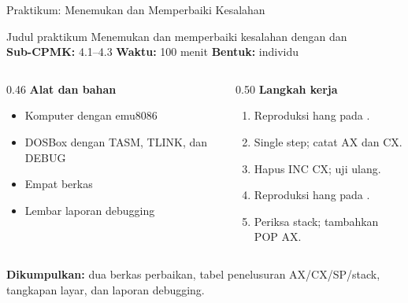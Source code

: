 \documentclass[aspectratio=169,11pt]{beamer}
\begin{document}
\begin{frame}{Praktikum: Menemukan dan Memperbaiki Kesalahan}
\begin{block}{Judul praktikum}
\small Menemukan dan memperbaiki kesalahan dengan 
dan \\[0.15em]
\textbf{Sub-CPMK:} 4.1--4.3 \quad\textbullet\quad
\textbf{Waktu:} 100 menit \quad\textbullet\quad
\textbf{Bentuk:} individu
\end{block}

\vspace{0.2em}
\begin{columns}[t]
\begin{column}{0.46\textwidth}
{\color{obeBlue}\bfseries Alat dan bahan}
\begin{itemize}\footnotesize
    \item Komputer dengan emu8086
    \item DOSBox dengan TASM, TLINK, dan DEBUG
    \item Empat berkas 
    \item Lembar laporan debugging
\end{itemize}
\end{column}
\begin{column}{0.50\textwidth}
{\color{obeBlue}\bfseries Langkah kerja}
\begin{enumerate}\footnotesize
    \item Reproduksi hang pada .
    \item Single step; catat AX dan CX.
    \item Hapus INC CX; uji ulang.
    \item Reproduksi hang pada .
    \item Periksa stack; tambahkan POP AX.
\end{enumerate}
\end{column}
\end{columns}

\vspace{0.2em}
{\footnotesize\textbf{Dikumpulkan:} dua berkas perbaikan, tabel
penelusuran AX/CX/SP/stack, tangkapan layar, dan laporan
debugging.\par}
\end{frame}
\end{document}
